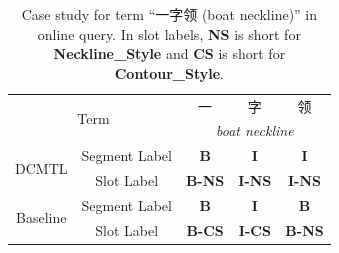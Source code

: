 
\begin{table}[h]
	\centering
	\small
	\caption{Case study for term ``一字领 (boat neckline)'' in online query.
		In slot labels, \textbf{NS} is short for \textbf{Neckline\_Style}
		and \textbf{CS} is short for \textbf{Contour\_Style}.}
	\begin{tabular}{c|c|c|c|c}
		\toprule
		\multicolumn{2}{c|}{\multirow{2}{*}{Term}} & 一 & 字 & 领  \\
		\cmidrule{3-5}
		\multicolumn{2}{c|}{} & \multicolumn{3}{c}{\emph{boat neckline}} \\
		\midrule
		\multirow{2}{*}{DCMTL} & Segment Label & \textbf{B} & \textbf{I} & \textbf{I} \\
		\cmidrule{2-5}
		& Slot Label & \textbf{B-NS} & \textbf{I-NS} & \textbf{I-NS} \\
		\midrule
	 	\multirow{2}{*}{Baseline} & Segment Label & \textbf{B} & \textbf{I} & \textbf{B} \\
		\cmidrule{2-5}
		& Slot Label & \textbf{B-CS} & \textbf{I-CS} & \textbf{B-NS} \\
		\bottomrule
	\end{tabular}
	\label{tab:case_study}
\end{table}

